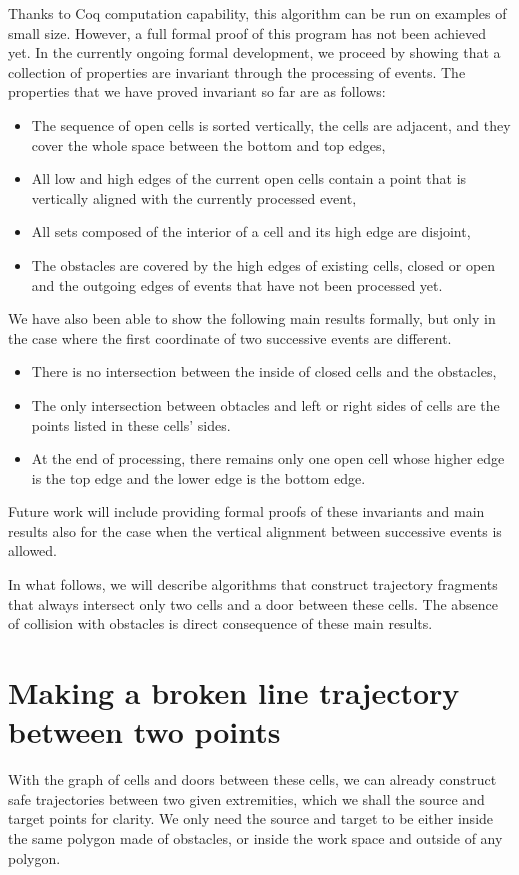 \documentclass{llncs}
\begin{document}
Thanks to Coq computation capability, this algorithm can be run on
examples of small size.  However, a full formal proof of this program has
not been achieved yet.  In the currently ongoing formal development, we
proceed by showing that a collection of properties are invariant
through the processing of events.  The properties that we have proved
invariant so far are as follows:
\begin{itemize}
\item The sequence of open cells is sorted vertically, the cells are
  adjacent, and they cover the whole space between the bottom and top
  edges,
\item All low and high edges of the current open cells contain a point
that is vertically aligned with the currently processed event,
\item All sets composed of the interior of a cell and its high edge
are disjoint,
\item The obstacles are covered by the high edges of existing cells,
  closed or open and the outgoing edges of events that have not been
  processed yet.
\end{itemize}
We have also been able to show the following main results formally, but only
in the case where the first coordinate of two successive events are different.
\begin{itemize}
\item There is no intersection between the inside of closed cells and the
obstacles,
\item The only intersection between obtacles and left or right sides of cells
are the points listed in these cells' sides.
\item At the end of processing, there remains only one open cell whose
higher edge is the top edge and the lower edge is the bottom edge.
\end{itemize}
Future work will include providing formal proofs of these invariants and
main results also for the case when the vertical alignment between
successive events is allowed.

In what follows, we will describe algorithms that
construct trajectory fragments that always
intersect only two cells and a door between these cells.
The absence of collision with obstacles is direct consequence of these
main results.
\section{Making a broken line trajectory between two points}
With the graph of cells and doors between these cells, we can already
construct safe trajectories between two given extremities, which we shall
the source and target points for clarity.  We only need the source and
target to be either inside the same polygon made of obstacles, or
inside the work space and outside of any polygon.
\end{document}
